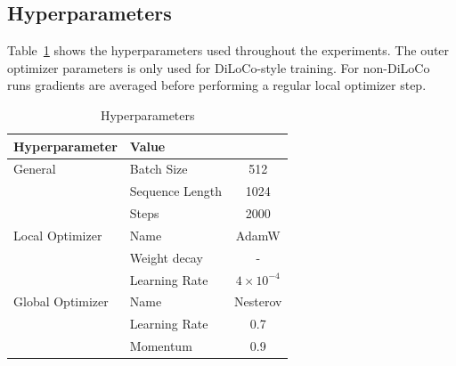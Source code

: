 \documentclass{article}
\begin{document}
\subsection{Hyperparameters}

Table~\ref{tab:hyperparameters} shows the hyperparameters used throughout the
experiments. The outer optimizer parameters is only used for DiLoCo-style
training. For non-DiLoCo runs gradients are averaged before performing a regular
local optimizer step.

\begin{table}[ht]
\centering
\begin{tabular}{llc}
\toprule
\textbf{Hyperparameter} & \textbf{Value} \\ 
\midrule
\multirow{1}{*}{General} & Batch Size & 512 \\ 
& Sequence Length & 1024 \\ 
& Steps & 2000 \\
\hline
\multirow{1}{*}{Local Optimizer} & Name & AdamW \\ 
& Weight decay & - \\ 
& Learning Rate & $4 \times 10^{-4}$ \\ 
\hline
\multirow{1}{*}{Global Optimizer} & Name & Nesterov \\ 
& Learning Rate & 0.7 \\ 
& Momentum & 0.9 \\ 
\bottomrule
\end{tabular}
\caption{Hyperparameters}
\label{tab:hyperparameters}
\end{table}
\end{document}
